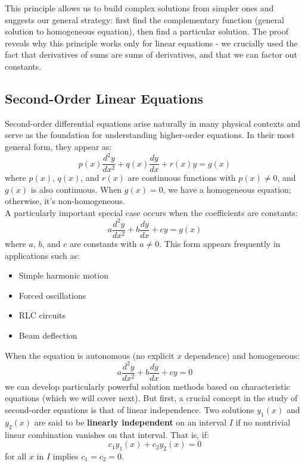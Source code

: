 \noindent This principle allows us to build complex solutions from simpler ones and suggests our general strategy: first find the complementary function (general solution to homogeneous equation), then find a particular solution. The proof reveals why this principle works only for linear equations - we crucially used the fact that derivatives of sums are sums of derivatives, and that we can factor out constants.

\subsection*{Second-Order Linear Equations} 

\noindent Second-order differential equations arise naturally in many physical contexts and serve as the foundation for understanding higher-order equations. In their most general form, they appear as:
\[
p(x)\frac{d^2y}{dx^2} + q(x)\frac{dy}{dx} + r(x)y = g(x)
\]
where $p(x)$, $q(x)$, and $r(x)$ are continuous functions with $p(x) \neq 0$, and $g(x)$ is also continuous. When $g(x) = 0$, we have a homogeneous equation; otherwise, it's non-homogeneous. \\

\noindent A particularly important special case occurs when the coefficients are constants:
\[
a\frac{d^2y}{dx^2} + b\frac{dy}{dx} + cy = g(x)
\]
where $a$, $b$, and $c$ are constants with $a \neq 0$. This form appears frequently in applications such as:
\begin{itemize}
    \item Simple harmonic motion
    \item Forced oscillations
    \item RLC circuits
    \item Beam deflection
\end{itemize}

\noindent When the equation is autonomous (no explicit $x$ dependence) and homogeneous:
\[
a\frac{d^2y}{dx^2} + b\frac{dy}{dx} + cy = 0
\]
we can develop particularly powerful solution methods based on characteristic equations (which we will cover next). But first, a crucial concept in the study of second-order equations is that of linear independence. Two solutions $y_1(x)$ and $y_2(x)$ are said to be \textbf{linearly independent}  on an interval $I$ if no nontrivial linear combination vanishes on that interval. That is, if:
\[
c_1y_1(x) + c_2y_2(x) = 0
\]
for all $x$ in $I$ implies $c_1 = c_2 = 0$. \\

